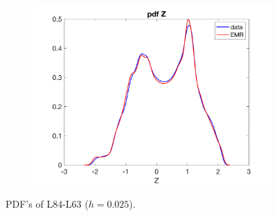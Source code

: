 \documentclass[12pt]{article}
\begin{document}
\begin{figure}[H]
\begin{subfigure}[b]{0.3\textwidth}
		\includegraphics[width=\textwidth]{plots/l84l63/pdfzl840025.png}
	\end{subfigure}
	\caption{PDF's of L84-L63 ($h=0.025$).}
\end{figure}
\end{document}
